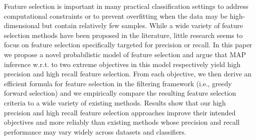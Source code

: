 Feature selection is important in many practical classification
settings to address computational constraints or to prevent
overfitting when the data may be high-dimensional but contain
relatively few samples.  While a wide variety of feature selection
methods have been proposed in the literature, little research seems to
focus on feature selection specifically targeted for precision or
recall.  In this paper we propose a novel probabilistic model of
feature selection and argue that MAP inference w.r.t. to two extreme
objectives in this model respectively yield high precision and high
recall feature selection.  From each objective, we then derive an
efficient formula for feature selection in the filtering framework
(i.e., greedy forward selection) and we empirically compare the
resulting feature selection criteria to a wide variety of existing
methods.  Results show that our high precision and high recall feature
selection approaches improve their intended objectives and more
reliably than existing methods whose precision and recall performance
may vary widely across datasets and classifiers.




